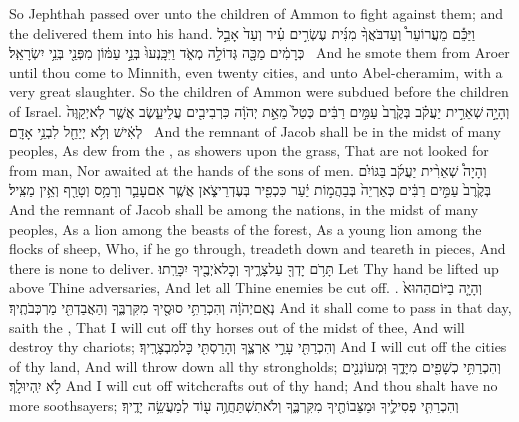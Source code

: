 {So Jephthah passed over unto the children of Ammon to fight against them; and the \lord\space delivered them into his hand.}
{וַיַּכֵּ֡ם מֵעֲרוֹעֵר֩ וְעַד\maqqaf בֹּאֲךָ֨ מִנִּ֜ית עֶשְׂרִ֣ים עִ֗יר וְעַד֙ אָבֵ֣ל כְּרָמִ֔ים מַכָּ֖ה גְּדוֹלָ֣ה מְאֹ֑ד וַיִּכָּֽנְעוּ֙ בְּנֵ֣י עַמּ֔וֹן מִפְּנֵ֖י בְּנֵ֥י יִשְׂרָאֵֽל׃ \petucha }
{And he smote them from Aroer until thou come to Minnith, even twenty cities, and unto Abel-cheramim, with a very great slaughter. So the children of Ammon were subdued before the children of Israel.}
\label{haft_40}
\setcounter{chap}{5}
\setcounter{verse}{6}
{וְהָיָ֣ה \legarmeh  שְׁאֵרִ֣ית יַעֲקֹ֗ב בְּקֶ֙רֶב֙ עַמִּ֣ים רַבִּ֔ים כְּטַל֙ מֵאֵ֣ת יְהֹוָ֔ה כִּרְבִיבִ֖ים עֲלֵי\maqqaf עֵ֑שֶׂב אֲשֶׁ֤ר לֹֽא\maqqaf יְקַוֶּה֙ לְאִ֔ישׁ וְלֹ֥א יְיַחֵ֖ל לִבְנֵ֥י אָדָֽם׃ \petucha }
{And the remnant of Jacob shall be in the midst of many peoples, As dew from the \lord, as showers upon the grass, That are not looked for from man, Nor awaited at the hands of the sons of men.}
{וְהָיָה֩ שְׁאֵרִ֨ית יַעֲקֹ֜ב בַּגּוֹיִ֗ם בְּקֶ֙רֶב֙ עַמִּ֣ים רַבִּ֔ים כְּאַרְיֵה֙ בְּבַהֲמ֣וֹת יַ֔עַר כִּכְפִ֖יר בְּעֶדְרֵי\maqqaf צֹ֑אן אֲשֶׁ֧ר אִם\maqqaf עָבַ֛ר וְרָמַ֥ס וְטָרַ֖ף וְאֵ֥ין מַצִּֽיל׃}
{And the remnant of Jacob shall be among the nations, in the midst of many peoples, As a lion among the beasts of the forest, As a young lion among the flocks of sheep, Who, if he go through, treadeth down and teareth in pieces, And there is none to deliver.}
{תָּרֹ֥ם יָדְךָ֖ עַל\maqqaf צָרֶ֑יךָ וְכׇל\maqqaf אֹיְבֶ֖יךָ יִכָּרֵֽתוּ׃}
{Let Thy hand be lifted up above Thine adversaries, And let all Thine enemies be cut off. .}
{וְהָיָ֤ה בַיּוֹם\maqqaf הַהוּא֙ נְאֻם\maqqaf יְהֹוָ֔ה וְהִכְרַתִּ֥י סוּסֶ֖יךָ מִקִּרְבֶּ֑ךָ וְהַאֲבַדְתִּ֖י מַרְכְּבֹתֶֽיךָ׃}
{And it shall come to pass in that day, saith the \lord, That I will cut off thy horses out of the midst of thee, And will destroy thy chariots;}
{וְהִכְרַתִּ֖י עָרֵ֣י אַרְצֶ֑ךָ וְהָרַסְתִּ֖י כׇּל\maqqaf מִבְצָרֶֽיךָ׃}
{And I will cut off the cities of thy land, And will throw down all thy strongholds;}
{וְהִכְרַתִּ֥י כְשָׁפִ֖ים מִיָּדֶ֑ךָ וּֽמְעוֹנְנִ֖ים לֹ֥א יִֽהְיוּ\maqqaf לָֽךְ׃}
{And I will cut off witchcrafts out of thy hand; And thou shalt have no more soothsayers;}
{וְהִכְרַתִּ֧י פְסִילֶ֛יךָ וּמַצֵּבוֹתֶ֖יךָ מִקִּרְבֶּ֑ךָ וְלֹא\maqqaf תִשְׁתַּחֲוֶ֥ה ע֖וֹד לְמַעֲשֵׂ֥ה יָדֶֽיךָ׃}
